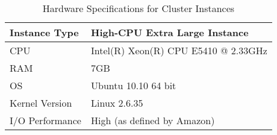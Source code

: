 \begin{table}[!h]
    \centering
    \caption{Hardware Specifications for Cluster Instances}
    \label{tab:hwcda}
    \begin{tabular}{| l | l |}
	\hline
	Instance Type       &High-CPU Extra Large Instance\\
	\hline
	CPU		            &Intel(R) Xeon(R) CPU E5410 @ 2.33GHz\\
	\hline
	RAM		            &7GB\\
	\hline
	OS		            &Ubuntu 10.10 64 bit\\
	\hline
	Kernel Version	    &Linux 2.6.35\\
	\hline
	I/O Performance	    &High (as defined by Amazon)\\
	\hline
    \end{tabular}
\end{table}
